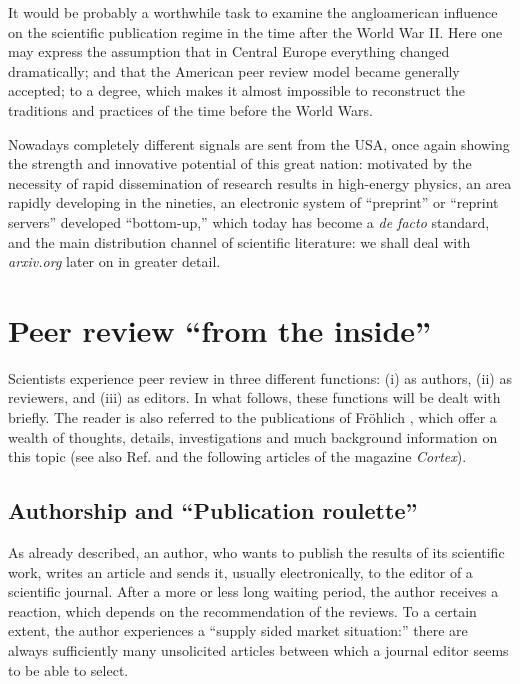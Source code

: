 It would be probably a worthwhile task to examine the angloamerican
influence on the scientific publication regime in the time after the
World War II.  Here one may express the assumption that in Central
Europe everything changed dramatically; and that the American peer
review model became generally accepted; to a degree, which
makes it almost impossible to reconstruct the traditions and practices
of the time before the World Wars.

Nowadays completely different signals are sent from the USA, once again
showing the strength and innovative potential of this great nation:
motivated by the necessity of rapid dissemination of research results in
high-energy physics, an area rapidly developing in the nineties, an
electronic system of ``preprint'' or ``reprint servers'' developed
``bottom-up,'' which today has become a {\it de facto} standard, and the
main distribution channel of scientific literature:  we shall deal with
{\it arxiv.org} later on in greater detail.


\section{Peer review ``from the inside''}

Scientists experience peer review in three different functions:  (i) as authors,
(ii) as reviewers, and (iii) as editors.
In what follows, these functions will be dealt with
briefly.  The reader is also referred to the publications of Fr\"ohlich
\cite{2002-froehlich,2003-froehlich}, which offer a wealth of thoughts,
details, investigations and much background information on this topic
(see also Ref.  \cite{sala-2002} and the following articles of the
magazine {\it Cortex}).

\subsection{Authorship and ``Publication roulette''}

As already described, an author, who wants to publish the results of its
scientific work, writes an article and sends it, usually
electronically, to the editor of a scientific journal.  After a more or
less long waiting period, the author receives a reaction, which depends
on the recommendation of the reviews.  To a certain extent, the author experiences
a ``supply sided market situation:''  there are always
sufficiently many unsolicited articles between which a journal editor seems to be able
to select.

